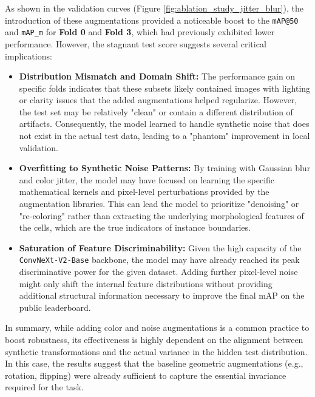 \documentclass[a4paper]{article} %
\begin{document}
As shown in the validation curves (Figure \ref{fig:ablation_study_jitter_blur}), the introduction of these augmentations provided a noticeable boost to the \texttt{mAP@50} and \texttt{mAP\_m} for \textbf{Fold 0} and \textbf{Fold 3}, which had previously exhibited lower performance. However, the stagnant test score suggests several critical implications:

\begin{itemize}
    \item \textbf{Distribution Mismatch and Domain Shift:} The performance gain on specific folds indicates that these subsets likely contained images with lighting or clarity issues that the added augmentations helped regularize. However, the test set may be relatively "clean" or contain a different distribution of artifacts. Consequently, the model learned to handle synthetic noise that does not exist in the actual test data, leading to a "phantom" improvement in local validation.
    \item \textbf{Overfitting to Synthetic Noise Patterns:} By training with Gaussian blur and color jitter, the model may have focused on learning the specific mathematical kernels and pixel-level perturbations provided by the augmentation libraries. This can lead the model to prioritize "denoising" or "re-coloring" rather than extracting the underlying morphological features of the cells, which are the true indicators of instance boundaries.
    \item \textbf{Saturation of Feature Discriminability:} Given the high capacity of the \texttt{ConvNeXt-V2-Base} backbone, the model may have already reached its peak discriminative power for the given dataset. Adding further pixel-level noise might only shift the internal feature distributions without providing additional structural information necessary to improve the final mAP on the public leaderboard.
\end{itemize}

In summary, while adding color and noise augmentations is a common practice to boost robustness, its effectiveness is highly dependent on the alignment between synthetic transformations and the actual variance in the hidden test distribution. In this case, the results suggest that the baseline geometric augmentations (e.g., rotation, flipping) were already sufficient to capture the essential invariance required for the task.

\printbibliography %
\end{document}
